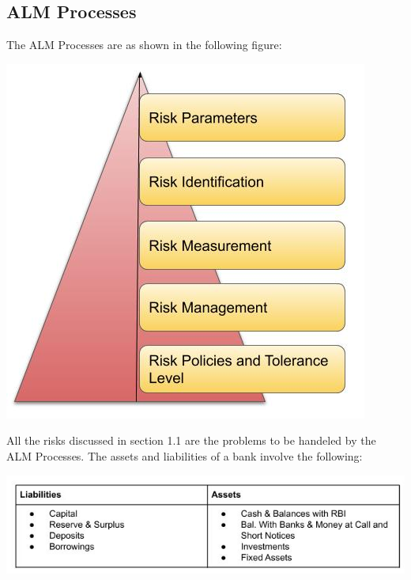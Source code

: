 	\subsection{ALM Processes}
		The ALM Processes are as shown in the following figure:
		
		\begin{center}
		\includegraphics[width=\linewidth]{figures/ALM_Process.jpg}	
		\label{fig:ALM Processes}
		\end{center}
		

		All the risks discussed in section 1.1 are the problems to be handeled by the ALM Processes. The assets and liabilities of a bank involve the following:

		\begin{center}
		\includegraphics[width=\linewidth]{figures/Components_of_Banks_Balance_Sheet.jpg}	
		\label{fig:Components of Banks Balance Sheet}
		\end{center}
	
